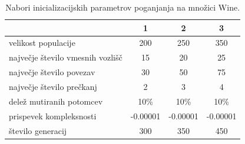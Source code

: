 \begin{table}[H]
    \begin{center}
        \begin{tabular}{||l c c c||}
            \hline
            & 1        & 2        & 3 \\ [0.5ex]
            \hline
            velikost populacije              & 200      & 250      & 350      \\
            \hline
            največje število vmesnih vozlišč & 15       & 20       & 25       \\
            \hline
            največje število povezav         & 30       & 50       & 75       \\
            \hline
            največje število prečkanj        & 2        & 3        & 4        \\
            \hline
            delež mutiranih potomcev         & 10\%     & 10\%     & 10\%     \\
            \hline
            prispevek kompleksnosti          & -0.00001 & -0.00001 & -0.00001 \\
            \hline
            število generacij                & 300      & 350      & 450      \\
            \hline
        \end{tabular}
    \end{center}
    \caption{Nabori inicializacijskih parametrov poganjanja na množici Wine.}
    \label{tab:param_wine}
\end{table}

